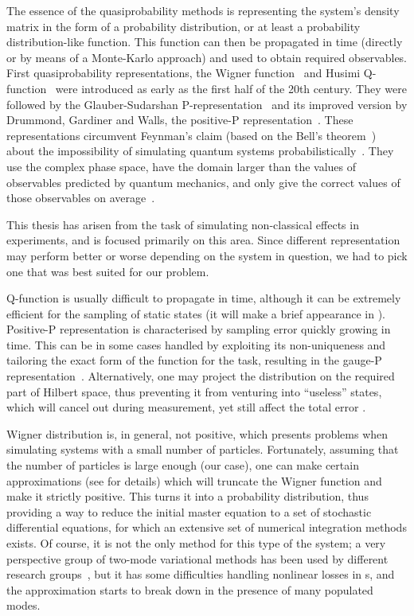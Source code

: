 The essence of the quasiprobability methods is representing the system's density matrix in the form of a probability distribution, or at least a probability distribution-like function.
This function can then be propagated in time (directly or by means of a Monte-Karlo approach) and used to obtain required observables.
First quasiprobability representations, the Wigner function~\cite{Wigner1932,Dirac1945,Moyal1947} and Husimi Q-function~\cite{Husimi1940} were introduced as early as the first half of the 20th century.
They were followed by the Glauber-Sudarshan P-representation~\cite{Sudarshan1963,Glauber1963b,Glauber1963} and its improved version by Drummond, Gardiner and Walls, the positive-P representation~\cite{Drummond1980,Drummond1981}.
These representations circumvent Feynman's claim (based on the Bell's theorem~\cite{Bell1964}) about the impossibility of simulating quantum systems probabilistically~\cite{Feynman1982}.
They use the complex phase space, have the domain larger than the values of observables predicted by quantum mechanics, and only give the correct values of those observables on average~\cite{Opanchuk2013-bell-sim}.

This thesis has arisen from the task of simulating non-classical effects in  experiments, and is focused primarily on this area.
Since different representation may perform better or worse depending on the system in question, we had to pick one that was best suited for our problem.

Q-function is usually difficult to propagate in time, although it can be extremely efficient for the sampling of static states (it will make a brief appearance in ).
Positive-P representation is characterised by sampling error quickly growing in time.
This can be in some cases handled by exploiting its non-uniqueness and tailoring the exact form of the function for the task, resulting in the gauge-P representation~\cite{Deuar2002}.
Alternatively, one may project the distribution on the required part of Hilbert space, thus preventing it from venturing into ``useless'' states, which will cancel out during measurement, yet still affect the total error .

Wigner distribution is, in general, not positive, which presents problems when simulating systems with a small number of particles.
Fortunately, assuming that the number of particles is large enough (our case), one can make certain approximations (see  for details) which will truncate the Wigner function and make it strictly positive.
This turns it into a probability distribution, thus providing a way to reduce the initial master equation to a set of stochastic differential equations, for which an extensive set of numerical integration methods exists.
Of course, it is not the only method for this type of the system; a very perspective group of two-mode variational methods has been used by different research groups~\cite{Li2008,Li2009,Sinatra2011},
but it has some difficulties handling nonlinear losses in s, and the approximation starts to break down in the presence of many populated modes.

